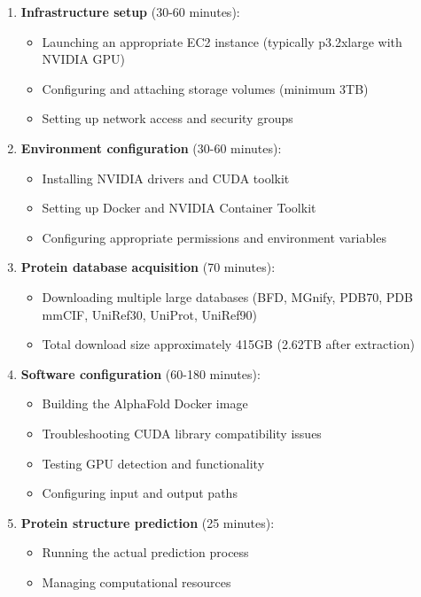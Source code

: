 \begin{enumerate}
    \item \textbf{Infrastructure setup} (30-60 minutes):
    \begin{itemize}
        \item Launching an appropriate EC2 instance (typically p3.2xlarge with NVIDIA GPU)
        \item Configuring and attaching storage volumes (minimum 3TB)
        \item Setting up network access and security groups
    \end{itemize}
    
    \item \textbf{Environment configuration} (30-60 minutes):
    \begin{itemize}
        \item Installing NVIDIA drivers and CUDA toolkit
        \item Setting up Docker and NVIDIA Container Toolkit
        \item Configuring appropriate permissions and environment variables
    \end{itemize}
    
    \item \textbf{Protein database acquisition} (70 minutes):
    \begin{itemize}
        \item Downloading multiple large databases (BFD, MGnify, PDB70, PDB mmCIF, UniRef30, UniProt, UniRef90)
        \item Total download size approximately 415GB (2.62TB after extraction)
    \end{itemize}
    
    \item \textbf{Software configuration} (60-180 minutes):
    \begin{itemize}
        \item Building the AlphaFold Docker image
        \item Troubleshooting CUDA library compatibility issues
        \item Testing GPU detection and functionality
        \item Configuring input and output paths
    \end{itemize}
    
    \item \textbf{Protein structure prediction} (25 minutes):
    \begin{itemize}
        \item Running the actual prediction process
        \item Managing computational resources
    \end{itemize}
\end{enumerate}


